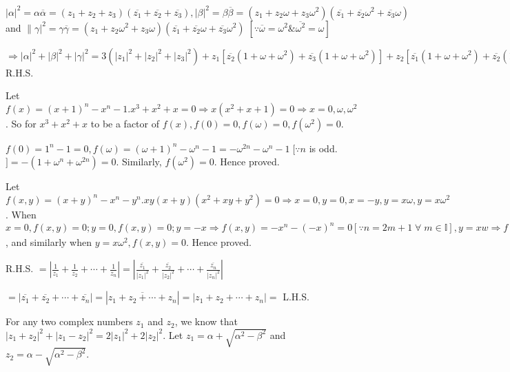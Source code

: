   $|\alpha|^2 = \alpha\overline{\alpha} = (z_1 + z_2 + z_3)(\overline{z_1} + \overline{z_2} +
  \overline{z_3}), |\beta|^2 = \beta\overline{\beta} = (z_1 + z_2\omega + z_3\omega^2)(\overline{z_1} +
  \overline{z_2}\omega^2 + \overline{z_3}\omega)$ and $\|\gamma|^2 = \gamma\overline{\gamma} = (z_1 +
  z_2\omega^2 + z_3\omega)(\overline{z_1} + \overline{z_2}\omega + \overline{z_3}\omega^2)\;[\because
    \overline{\omega} = \omega^2 \& \overline{\omega^2} = \omega]$

  $\Rightarrow |\alpha|^2 + |\beta|^2 + |\gamma|^2 = 3(|z_1|^2 + |z_2|^2 + |z_3|^2) + z_1[\overline{z_2}(1 +
    \omega + \omega^2) + \overline{z_3}(1 + \omega + \omega^2)] + z_2[\overline{z_1}(1 + \omega + \omega^2)
    + \overline{z_2}(1 + \omega + \omega^2)] + z_3[\overline{z_1}(1 + \omega + \omega^2) + \overline{z_2}(1
    + \omega + \omega^2)] = 3(|z_1|^2 + |z_2|^2 + |z_3|^2) =$ R.H.S.
\item Let $f(x) = (x + 1)^n - x^n - 1. x^3 + x^2 + x = 0 \Rightarrow x(x^2 + x + 1) = 0\Rightarrow x = 0,
  \omega, \omega^2$. So for $x^3 + x^2 + x$ to be a factor of $f(x), f(0) = 0, f(\omega) = 0, f(\omega^2) =
  0$.

  $f(0) = 1^n - 1 = 0, f(\omega) = (\omega + 1)^n - \omega^n - 1 = -\omega^{2n} - \omega^n - 1\;[\because n$
    is odd. $] = -(1 + \omega^n + \omega^{2n}) = 0$. Similarly, $f(\omega^2) = 0$. Hence proved.
\item Let $f(x, y) = (x + y)^n - x^n - y^n. xy(x + y)(x^2 + xy + y^2) = 0 \Rightarrow x = 0, y = 0, x = -y, y =
  x\omega, y = x\omega^2$. When $x = 0, f(x, y) = 0; y = 0, f(x, y) = 0; y = -x \Rightarrow f(x, y) = -x^n -(-x)^n =
  0 [\because n = 2m + 1\;\forall\;m\in\mathbb{I}], y = xw \Rightarrow f(x, y) = [x^n(1 + \omega)^n - x^n -
    x^n\omega^n] = -x^n\omega^{2n} - x^n - x^n\omega^n = 0$, and similarly when $y = x\omega^2, f(x, y) =
  0$. Hence proved.
\item R.H.S. $= \left|\frac{1}{z_1} + \frac{1}{z_2} + \cdots + \frac{1}{z_n}\right| =
  \left|\frac{\overline{z_1}}{|z_1|^2} + \frac{\overline{z_2}}{|z_2|^2} + \cdots +
  \frac{\overline{z_n}}{|z_n|^2}\right|$

  $= |\overline{z_1} + \overline{z_2} + \cdots + \overline{z_n}| = |\overline{z_1 + z_2 + \cdots + z_n}| =
  |z_1 + z_2 + \cdots + z_n| =$ L.H.S.
\item For any two complex numbers $z_1$ and $z_2$, we know that $|z_1 + z_2|^2 + |z_1 - z_2|^2 = 2|z_1|^2 +
  2|z_2|^2$. Let $z_1 = \alpha + \sqrt{\alpha^2 - \beta^2}$ and $z_2 = \alpha - \sqrt{\alpha^2 - \beta^2}$.

